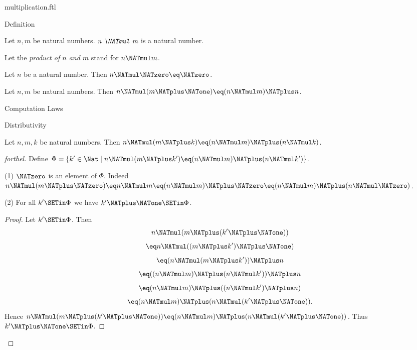 \documentclass{stex}
\begin{document}
\begin{smodule}{multiplication.ftl}

\begin{sfragment}{Definition}
  \begin{signature}[forthel,id=ARITHMETIC_06_6626346484629504]
    Let $n, m$ be natural numbers.
    $\emph{n \NATmul m}$ is a natural number.

    Let the \emph{product of $n$ and $m$} stand for $n \NATmul m$.
  \end{signature}

  \begin{axiom}[forthel,id=ARITHMETIC_06_8941041092657152]
    Let $n$ be a natural number.
    Then $n \NATmul \NATzero \eq \NATzero$.
  \end{axiom}

  \begin{axiom}[forthel,id=ARITHMETIC_06_2211275408932864]
    Let $n, m$ be natural numbers.
    Then $n \NATmul (m \NATplus \NATone) \eq (n \NATmul m) \NATplus n$.
  \end{axiom}
\end{sfragment}

\begin{sfragment}{Computation Laws}
  \begin{sfragment}{Distributivity}
    \begin{proposition}[forthel,id=ARITHMETIC_06_9001524774567936]
      Let $n, m, k$ be natural numbers.
      Then $n \NATmul (m \NATplus k) \eq (n \NATmul m) \NATplus (n \NATmul k)$.
    \end{proposition}
    \begin{proof}[forthel]
      Define $\Phi = \{ k' \in \Nat \mid n \NATmul (m \NATplus k') \eq (n \NATmul m) \NATplus (n \NATmul k') \}$.

      (1) $\NATzero$ is an element of $\Phi$.
      Indeed $n \NATmul (m \NATplus \NATzero)
        \eq n \NATmul m
        \eq (n \NATmul m) \NATplus \NATzero
        \eq (n \NATmul m) \NATplus (n \NATmul \NATzero)$.

      (2) For all $k' \SETin \Phi$ we have $k' \NATplus \NATone \SETin \Phi$. 
      \begin{proof}
        Let $k'\SETin \Phi$.
        Then
        \[  n \NATmul (m \NATplus (k' \NATplus \NATone))                  \]
        \[    \eq n \NATmul ((m \NATplus k') \NATplus \NATone)              \]
        \[    \eq (n \NATmul (m \NATplus k')) \NATplus n              \]
        \[    \eq ((n \NATmul m) \NATplus (n \NATmul k')) \NATplus n    \]
        \[    \eq (n \NATmul m) \NATplus ((n \NATmul k') \NATplus n)    \]
        \[    \eq (n \NATmul m) \NATplus (n \NATmul (k' \NATplus \NATone)).   \]
        Hence $n \NATmul (m \NATplus (k' \NATplus \NATone)) \eq (n \NATmul m) \NATplus (n \NATmul (k' \NATplus \NATone))$.
        Thus $k' \NATplus \NATone \SETin \Phi$.
      \end{proof}


\end{proof}
\end{sfragment}
\end{sfragment}
\end{smodule}
\end{document}
